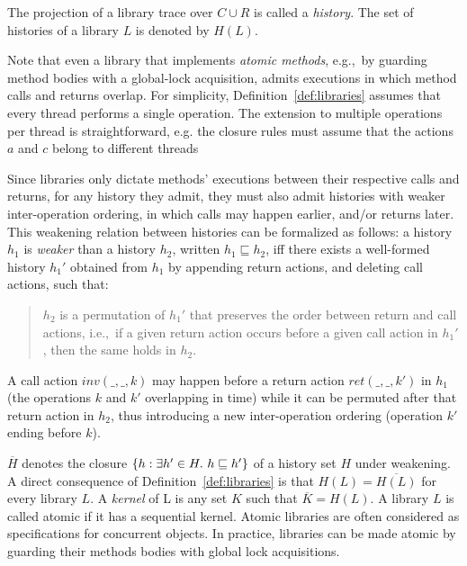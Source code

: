 The projection of a library trace over $C\cup R$ is called a \emph{history}. The set of histories of a library $L$ is denoted by $H(L)$.

Note that even a library that implements \emph{atomic methods}, e.g.,~by
guarding method bodies with a global-lock acquisition, admits executions in
which method calls and returns overlap. 
For simplicity, Definition~\ref{def:libraries} assumes that every thread performs a single operation. The extension to multiple operations per thread is straightforward, e.g. the closure rules must assume that the actions $a$ and $c$ belong to different threads

Since libraries only dictate methods’ executions between their respective calls and returns, for any history they admit, they must also 
admit histories with weaker inter-operation ordering, in which calls may happen earlier, and/or returns later. This weakening relation
between histories can be formalized as follows: a history $h_1$ is \emph{weaker} than a history $h_2$, written $h_1 \sqsubseteq h_2$, 
if{f} there exists a well-formed history $h_1'$
obtained from $h_1$ by appending return actions, and deleting call actions,
such that:
\begin{quote}

  $h_2$ is a permutation of $h_1'$ that preserves the order between
  return and call actions, i.e.,~if a given return action occurs before a given
  call action in $h_1'$, then the same holds in $h_2$.

\end{quote}
A call action $inv(\_,\_,k)$ may happen before a return action $ret(\_,\_,k')$ in $h_1$ (the operations $k$ and $k'$ overlapping in time) while it can be permuted after that return action in $h_2$, thus introducing a new inter-operation ordering (operation $k'$ ending before $k$). 

$\overline{H}$ denotes the closure ${\{ h: \exists h' \in H.\ h \sqsubseteq h' \}}$ of a 
history set $H$ under weakening.
A direct consequence of Definition~\ref{def:libraries} is that $H(L)=\overline{H(L)}$ for
every library $L$. A \emph{kernel} of L is any set $K$ such that $\overline{K} = H(L)$.
A library $L$ is called atomic if it has a sequential kernel. 
Atomic libraries are often considered as specifications for concurrent objects. 
In practice, libraries can be made atomic by guarding their methods bodies with global lock acquisitions.

